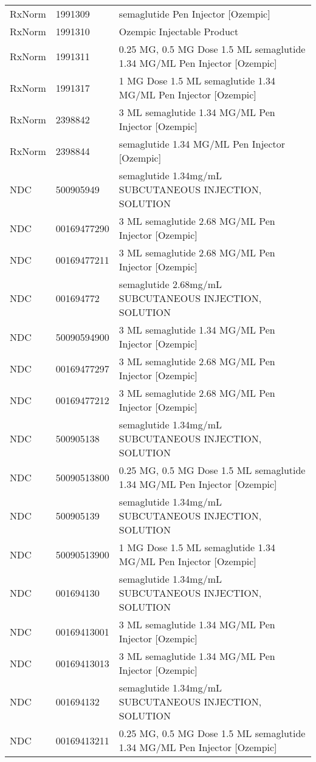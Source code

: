 \begin{longtable}{p{}p{}p{}}
  RxNorm & 1991309 & semaglutide Pen Injector [Ozempic] \\ 
  RxNorm & 1991310 & Ozempic Injectable Product \\ 
  RxNorm & 1991311 & 0.25 MG, 0.5 MG Dose 1.5 ML semaglutide 1.34 MG/ML Pen Injector [Ozempic] \\ 
  RxNorm & 1991317 & 1 MG Dose 1.5 ML semaglutide 1.34 MG/ML Pen Injector [Ozempic] \\ 
  RxNorm & 2398842 & 3 ML semaglutide 1.34 MG/ML Pen Injector [Ozempic] \\ 
  RxNorm & 2398844 & semaglutide 1.34 MG/ML Pen Injector [Ozempic] \\ 
  NDC & 500905949 & semaglutide 1.34mg/mL SUBCUTANEOUS INJECTION, SOLUTION \\ 
  NDC & 00169477290 & 3 ML semaglutide 2.68 MG/ML Pen Injector [Ozempic] \\ 
  NDC & 00169477211 & 3 ML semaglutide 2.68 MG/ML Pen Injector [Ozempic] \\ 
  NDC & 001694772 & semaglutide 2.68mg/mL SUBCUTANEOUS INJECTION, SOLUTION \\ 
  NDC & 50090594900 & 3 ML semaglutide 1.34 MG/ML Pen Injector [Ozempic] \\ 
  NDC & 00169477297 & 3 ML semaglutide 2.68 MG/ML Pen Injector [Ozempic] \\ 
  NDC & 00169477212 & 3 ML semaglutide 2.68 MG/ML Pen Injector [Ozempic] \\ 
  NDC & 500905138 & semaglutide 1.34mg/mL SUBCUTANEOUS INJECTION, SOLUTION \\ 
  NDC & 50090513800 & 0.25 MG, 0.5 MG Dose 1.5 ML semaglutide 1.34 MG/ML Pen Injector [Ozempic] \\ 
  NDC & 500905139 & semaglutide 1.34mg/mL SUBCUTANEOUS INJECTION, SOLUTION \\ 
  NDC & 50090513900 & 1 MG Dose 1.5 ML semaglutide 1.34 MG/ML Pen Injector [Ozempic] \\ 
  NDC & 001694130 & semaglutide 1.34mg/mL SUBCUTANEOUS INJECTION, SOLUTION \\ 
  NDC & 00169413001 & 3 ML semaglutide 1.34 MG/ML Pen Injector [Ozempic] \\ 
  NDC & 00169413013 & 3 ML semaglutide 1.34 MG/ML Pen Injector [Ozempic] \\ 
  NDC & 001694132 & semaglutide 1.34mg/mL SUBCUTANEOUS INJECTION, SOLUTION \\ 
  NDC & 00169413211 & 0.25 MG, 0.5 MG Dose 1.5 ML semaglutide 1.34 MG/ML Pen Injector [Ozempic] \\ 

\end{longtable}
